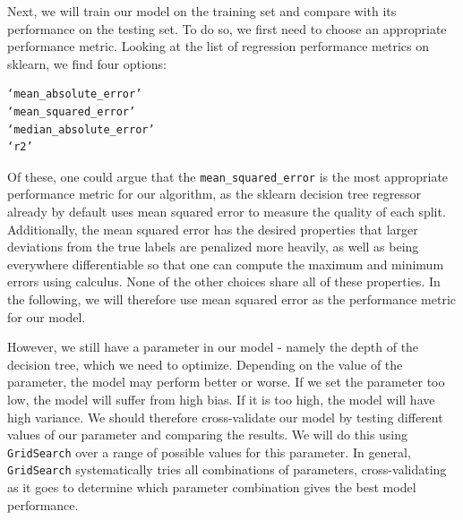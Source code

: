 \documentclass[12 pt]{article}
\numberwithin{equation}{section}
\begin{document}
Next, we will train our model on the training set and compare with its performance on the testing set. To do so, we first need to choose an appropriate performance metric. Looking at the list of regression performance metrics on sklearn, we find four options:
\begin{verbatim} 	 
‘mean_absolute_error’ 
‘mean_squared_error’		 
‘median_absolute_error’		 
‘r2’
\end{verbatim}
Of these, one could argue that the \texttt{mean\_squared\_error} is the most appropriate performance metric for our algorithm, as the sklearn decision tree regressor already by default uses mean squared error to measure the quality of each split. Additionally, the mean squared error has the desired properties that larger deviations from the true labels are penalized more heavily, as well as being everywhere differentiable so that one can compute the maximum and minimum errors using calculus. None of the other choices share all of these properties. In the following, we will therefore use mean squared error as the performance metric for our model.

 However, we still have a parameter in our model - namely the depth of the decision tree, which we need to optimize. Depending on the value of the parameter, the model may perform better or worse. If we set the parameter too low, the model will suffer from high bias. If it is too high, the model will have high variance. We should therefore cross-validate our model by testing different values of our parameter and comparing the results. We will do this using \texttt{GridSearch} over a range of possible values for this parameter. In general, \texttt{GridSearch} systematically tries all combinations of parameters, cross-validating as it goes to determine which parameter combination gives the best model performance.
\end{document}
